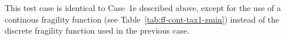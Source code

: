 This test case is identical to Case~1e described above, except for the use of a continous fragility function (see Table~\ref{tab:ff-cont-tax1-zmin}) instead of the discrete fragility function used in the previous case.